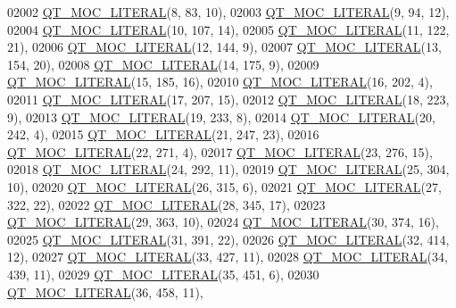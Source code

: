 \begin{DoxyCode}
02002 \hyperlink{a00016_a75bb9482d242cde0a06c9dbdc6b83abe}{QT\_MOC\_LITERAL}(8, 83, 10),
02003 \hyperlink{a00016_a75bb9482d242cde0a06c9dbdc6b83abe}{QT\_MOC\_LITERAL}(9, 94, 12),
02004 \hyperlink{a00016_a75bb9482d242cde0a06c9dbdc6b83abe}{QT\_MOC\_LITERAL}(10, 107, 14),
02005 \hyperlink{a00016_a75bb9482d242cde0a06c9dbdc6b83abe}{QT\_MOC\_LITERAL}(11, 122, 21),
02006 \hyperlink{a00016_a75bb9482d242cde0a06c9dbdc6b83abe}{QT\_MOC\_LITERAL}(12, 144, 9),
02007 \hyperlink{a00016_a75bb9482d242cde0a06c9dbdc6b83abe}{QT\_MOC\_LITERAL}(13, 154, 20),
02008 \hyperlink{a00016_a75bb9482d242cde0a06c9dbdc6b83abe}{QT\_MOC\_LITERAL}(14, 175, 9),
02009 \hyperlink{a00016_a75bb9482d242cde0a06c9dbdc6b83abe}{QT\_MOC\_LITERAL}(15, 185, 16),
02010 \hyperlink{a00016_a75bb9482d242cde0a06c9dbdc6b83abe}{QT\_MOC\_LITERAL}(16, 202, 4),
02011 \hyperlink{a00016_a75bb9482d242cde0a06c9dbdc6b83abe}{QT\_MOC\_LITERAL}(17, 207, 15),
02012 \hyperlink{a00016_a75bb9482d242cde0a06c9dbdc6b83abe}{QT\_MOC\_LITERAL}(18, 223, 9),
02013 \hyperlink{a00016_a75bb9482d242cde0a06c9dbdc6b83abe}{QT\_MOC\_LITERAL}(19, 233, 8),
02014 \hyperlink{a00016_a75bb9482d242cde0a06c9dbdc6b83abe}{QT\_MOC\_LITERAL}(20, 242, 4),
02015 \hyperlink{a00016_a75bb9482d242cde0a06c9dbdc6b83abe}{QT\_MOC\_LITERAL}(21, 247, 23),
02016 \hyperlink{a00016_a75bb9482d242cde0a06c9dbdc6b83abe}{QT\_MOC\_LITERAL}(22, 271, 4),
02017 \hyperlink{a00016_a75bb9482d242cde0a06c9dbdc6b83abe}{QT\_MOC\_LITERAL}(23, 276, 15),
02018 \hyperlink{a00016_a75bb9482d242cde0a06c9dbdc6b83abe}{QT\_MOC\_LITERAL}(24, 292, 11),
02019 \hyperlink{a00016_a75bb9482d242cde0a06c9dbdc6b83abe}{QT\_MOC\_LITERAL}(25, 304, 10),
02020 \hyperlink{a00016_a75bb9482d242cde0a06c9dbdc6b83abe}{QT\_MOC\_LITERAL}(26, 315, 6),
02021 \hyperlink{a00016_a75bb9482d242cde0a06c9dbdc6b83abe}{QT\_MOC\_LITERAL}(27, 322, 22),
02022 \hyperlink{a00016_a75bb9482d242cde0a06c9dbdc6b83abe}{QT\_MOC\_LITERAL}(28, 345, 17),
02023 \hyperlink{a00016_a75bb9482d242cde0a06c9dbdc6b83abe}{QT\_MOC\_LITERAL}(29, 363, 10),
02024 \hyperlink{a00016_a75bb9482d242cde0a06c9dbdc6b83abe}{QT\_MOC\_LITERAL}(30, 374, 16),
02025 \hyperlink{a00016_a75bb9482d242cde0a06c9dbdc6b83abe}{QT\_MOC\_LITERAL}(31, 391, 22),
02026 \hyperlink{a00016_a75bb9482d242cde0a06c9dbdc6b83abe}{QT\_MOC\_LITERAL}(32, 414, 12),
02027 \hyperlink{a00016_a75bb9482d242cde0a06c9dbdc6b83abe}{QT\_MOC\_LITERAL}(33, 427, 11),
02028 \hyperlink{a00016_a75bb9482d242cde0a06c9dbdc6b83abe}{QT\_MOC\_LITERAL}(34, 439, 11),
02029 \hyperlink{a00016_a75bb9482d242cde0a06c9dbdc6b83abe}{QT\_MOC\_LITERAL}(35, 451, 6),
02030 \hyperlink{a00016_a75bb9482d242cde0a06c9dbdc6b83abe}{QT\_MOC\_LITERAL}(36, 458, 11),

\end{DoxyCode}
